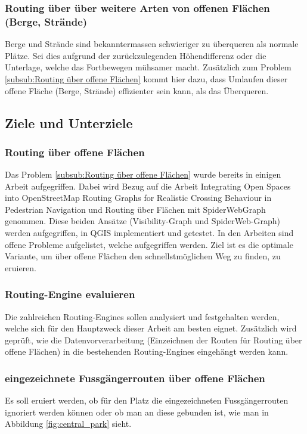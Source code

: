 \subsubsection{Routing über über weitere Arten von offenen Flächen (Berge, Strände)}
\label{subsub:Routing über über weitere Arten von offenen Flächen (Berge, Strände)}
Berge und Strände sind bekanntermassen schwieriger zu überqueren als normale Plätze. Sei dies aufgrund der zurückzulegenden Höhendifferenz oder die Unterlage, welche das Fortbewegen mühsamer macht. Zusätzlich zum Problem \ref{subsub:Routing über offene Flächen} kommt hier dazu, dass Umlaufen dieser offene Fläche (Berge, Strände) effizienter sein kann, als das Überqueren.  
	
\subsection{Ziele und Unterziele}
\label{sub:Ziele und Unterziele}

\subsubsection{Routing über offene Flächen}
\label{subsub:Ziel Routing über offene Flächen}
Das Problem \ref{subsub:Routing über offene Flächen} wurde bereits in einigen Arbeit aufgegriffen. Dabei wird Bezug auf die Arbeit Integrating Open Spaces into OpenStreetMap Routing Graphs for Realistic Crossing Behaviour in Pedestrian Navigation \cite{graser_visibility_graph} und Routing über Flächen mit SpiderWebGraph \cite{dzafic_spider_web_graph} genommen. Diese beiden Ansätze (Visibility-Graph und SpiderWeb-Graph) werden aufgegriffen, in QGIS implementiert und getestet. In den Arbeiten sind offene Probleme aufgelistet, welche aufgegriffen werden. Ziel ist es die optimale Variante, um über offene Flächen den schnellstmöglichen Weg zu finden, zu eruieren. 

\subsubsection{Routing-Engine evaluieren}
\label{subsub:Ziel Routing-Enginge evaluieren}
Die zahlreichen Routing-Engines sollen analysiert und festgehalten werden, welche sich für den Hauptzweck dieser Arbeit am besten eignet. Zusätzlich wird geprüft, wie die Datenvorverarbeitung (Einzeichnen der Routen für Routing über offene Flächen) in die bestehenden Routing-Engines eingehängt werden kann. 

\subsubsection{eingezeichnete Fussgängerrouten über offene Flächen}
\label{subsub:Ziel eingezeichnete Fussgängerrouten über offene Flächen}
Es soll eruiert werden, ob für den Platz die eingezeichneten Fussgängerrouten ignoriert werden können oder ob man an diese gebunden ist, wie man in Abbildung \ref{fig:central_park} sieht.

